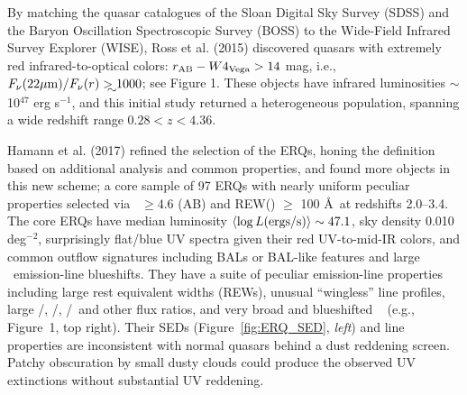 \smallskip
\smallskip
\noindent
By matching the quasar catalogues of the Sloan Digital Sky Survey
(SDSS) and the Baryon Oscillation Spectroscopic Survey (BOSS) to the
Wide-Field Infrared Survey Explorer (WISE), Ross et al. (2015)
discovered quasars with extremely red infrared-to-optical colors:
$r_{\rm AB}-W4_{\rm Vega}>14$ mag, i.e., $F_\nu({\rm 22\mu
m})/F_\nu(r) \gtrsim 1000$; see Figure 1. These objects have infrared
luminosities $\sim$10$^{47}$ erg s$^{-1}$, and this initial study
returned a heterogeneous population, spanning a wide redshift range
$0.28 < z < 4.36$.

\smallskip
\smallskip
\noindent
Hamann et al. (2017) refined the selection of the ERQs, honing the
definition based on additional analysis and common properties, and
found more objects in this new scheme; a core sample of 97
ERQs with nearly uniform peculiar properties selected via \imw\ $\ge
4.6$ (AB) and REW(\civ ) $\ge$ 100 \AA\ at redshifts 2.0--3.4.  The
core ERQs have median luminosity $\left<\log L ({\rm ergs/s})\right>
\sim 47.1$, sky density 0.010 deg$^{-2}$, surprisingly flat/blue UV
spectra given their red UV-to-mid-IR colors, and common outflow
signatures including BALs or BAL-like features and large \civ\
emission-line blueshifts.  They have a suite of peculiar emission-line
properties including large rest equivalent widths (REWs), unusual
``wingless'' line profiles, large \nv /\lya , \nv /\civ , \siiv /\civ\
and other flux ratios, and very broad and blueshifted \oiii\ 
(e.g., Figure~1, top right).  Their SEDs (Figure~\ref{fig:ERQ_SED},
{\it left}) and line properties are inconsistent with normal quasars
behind a dust reddening screen. Patchy obscuration by small dusty
clouds could produce the observed UV extinctions without substantial
UV reddening.


